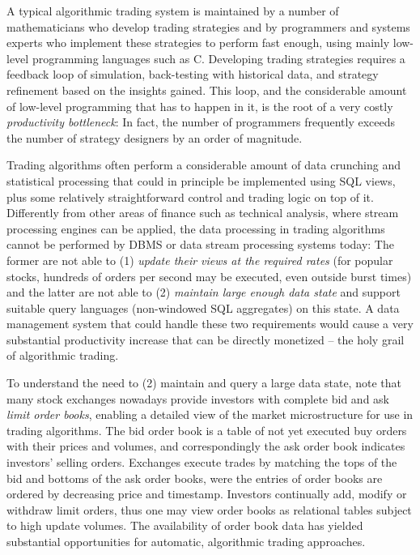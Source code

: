 A typical algorithmic trading system is maintained by a number of mathematicians who develop trading strategies and by programmers and systems experts who implement these strategies to perform fast enough, using mainly low-level programming languages such as C. Developing trading strategies requires a feedback loop of simulation, back-testing with historical data, and strategy refinement based on the insights gained. This loop, and the considerable amount of low-level programming that has to happen in it, is the root of a very costly {\em productivity bottleneck}\/: In fact, the number of programmers frequently exceeds the number of strategy designers by an order of magnitude.

Trading algorithms often perform a considerable amount of data crunching and statistical processing that could in principle be implemented using SQL views, plus some relatively straightforward control and trading logic on top of it. 
%
Differently from other areas of finance such as technical analysis,
where stream processing engines
\cite{abadi-vldbj:03,motwani-cidr:03} can be applied,
the data processing in trading algorithms cannot be performed by DBMS or data stream processing systems today: The former are not able to (1) {\em update their views at the required rates}\/ (for popular stocks, hundreds of orders per second may be executed, even outside burst times)
and the latter are not able to (2) {\em maintain large enough data state}\/ and support suitable query languages (non-windowed SQL aggregates) on this state.
%
A data management system that could handle these two requirements would cause a very substantial productivity increase that can be directly monetized -- the holy grail of algorithmic trading.

To understand the need to (2) maintain and query a large data state, note that
many stock exchanges nowadays provide investors with complete bid and ask {\em limit order books}\/, enabling a detailed view of the market microstructure for use in trading algorithms. The bid order book is a table of not yet executed buy orders with their prices and volumes, and correspondingly the ask order book indicates investors' selling
orders. Exchanges execute trades by matching the tops of the bid and bottoms of the ask order
books, were the entries of order books are ordered by decreasing price and timestamp. Investors continually add, modify or withdraw limit orders, thus one may view order books as relational tables subject to high update volumes.
The availability of order book data has yielded substantial opportunities for automatic, algorithmic trading approaches. 

